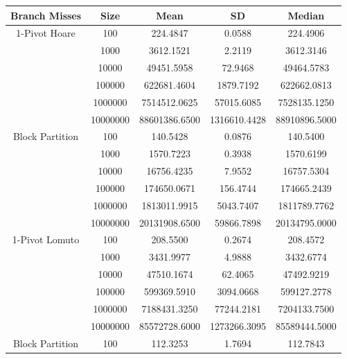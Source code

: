 \documentclass{article}
\begin{document}
\begin{center}
    \small
    \begin{tabular}{ |c c | c c c| }
        \hline
        Branch Misses   & Size     & Mean           & SD            & Median \\
        \hline
        1-Pivot Hoare   & 100      & 224.4847       & 0.0588        & 224.4906 \\
                        & 1000     & 3612.1521      & 2.2119        & 3612.3146 \\
                        & 10000    & 49451.5958     & 72.9468       & 49464.5783 \\
                        & 100000   & 622681.4604    & 1879.7192     & 622662.0813 \\
                        & 1000000  & 7514512.0625   & 57015.6085    & 7528135.1250 \\
                        & 10000000 & 88601386.6500  & 1316610.4428  & 88910896.5000 \\
        Block Partition & 100      & 140.5428       & 0.0876        & 140.5400 \\
                        & 1000     & 1570.7223      & 0.3938        & 1570.6199 \\
                        & 10000    & 16756.4235     & 7.9552        & 16757.5304 \\
                        & 100000   & 174650.0671    & 156.4744      & 174665.2439 \\
                        & 1000000  & 1813011.9915   & 5043.7407     & 1811789.7762 \\
                        & 10000000 & 20131908.6500  & 59866.7898    & 20134795.0000 \\
        \hline
        1-Pivot Lomuto  & 100      & 208.5500       & 0.2674        & 208.4572 \\
                        & 1000     & 3431.9977      & 4.9888        & 3432.6774 \\
                        & 10000    & 47510.1674     & 62.4065       & 47492.9219 \\
                        & 100000   & 599369.5910    & 3094.0668     & 599127.2778 \\
                        & 1000000  & 7188431.3250   & 77244.2181    & 7204133.7500 \\
                        & 10000000 & 85572728.6000  & 1273266.3095  & 85589444.5000 \\
        Block Partition & 100      & 112.3253       & 1.7694        & 112.7843 \\

\end{tabular}
\end{center}
\end{document}
